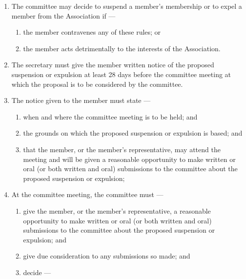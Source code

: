 \documentclass[../constitution.tex]{subfiles}
\begin{document}
\begin{enumerate}

  \item The committee may decide to suspend a member's membership or to expel a member from the Association if ---

        \begin{enumerate}

          \item the member contravenes any of these rules; or
          \item the member acts detrimentally to the interests of the Association.
        \end{enumerate}
  \item The secretary must give the member written notice of the proposed suspension or expulsion at least 28 days before the committee meeting at which the proposal is to be considered by the committee.
  \item The notice given to the member must state ---

        \begin{enumerate}

          \item when and where the committee meeting is to be held; and
          \item the grounds on which the proposed suspension or expulsion is based; and
          \item that the member, or the member's representative, may attend the meeting and will be given a reasonable opportunity to make written or oral (or both written and oral) submissions to the committee about the proposed suspension or expulsion;
        \end{enumerate}
  \item At the committee meeting, the committee must ---

        \begin{enumerate}

          \item give the member, or the member's representative, a reasonable opportunity to make written or oral (or both written and oral) submissions to the committee about the proposed suspension or expulsion; and
          \item give due consideration to any submissions so made; and
          \item decide ---

                \begin{enumerate}


\end{enumerate}
\end{enumerate}
\end{enumerate}
\end{document}
